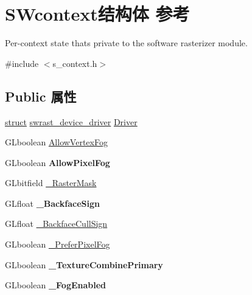 \hypertarget{struct_s_wcontext}{}\section{S\+Wcontext结构体 参考}
\label{struct_s_wcontext}


Per-\/context state that\textquotesingle{}s private to the software rasterizer module.  




{\ttfamily \#include $<$s\+\_\+context.\+h$>$}

\subsection*{Public 属性}
\begin{DoxyCompactItemize}
\item 
\hyperlink{interfacestruct}{struct} \hyperlink{structswrast__device__driver}{swrast\+\_\+device\+\_\+driver} \hyperlink{struct_s_wcontext_a0c0417617fb1e6d6a2976aba09a486c2}{Driver}
\item 
G\+Lboolean \hyperlink{struct_s_wcontext_af59816052a82b37da0e8e1152715959a}{Allow\+Vertex\+Fog}
\item 
\mbox{\label{struct_s_wcontext_a0f9330dfa9ce2ac36e81ee86ad077159}} 
G\+Lboolean {\bfseries Allow\+Pixel\+Fog}
\item 
G\+Lbitfield \hyperlink{struct_s_wcontext_ad2791c263e50ab089622ccef8cf998d1}{\+\_\+\+Raster\+Mask}
\item 
\mbox{\label{struct_s_wcontext_ac037e4e4a941f4c47b896397fd95a4c7}} 
G\+Lfloat {\bfseries \+\_\+\+Backface\+Sign}
\item 
G\+Lfloat \hyperlink{struct_s_wcontext_a51f029169973219098add5f8345c6874}{\+\_\+\+Backface\+Cull\+Sign}
\item 
G\+Lboolean \hyperlink{struct_s_wcontext_a756b218b6199d933c784a1ce6e7878d8}{\+\_\+\+Prefer\+Pixel\+Fog}
\item 
\mbox{\label{struct_s_wcontext_ab9fc6879eb7247c457792c56e00d4a71}} 
G\+Lboolean {\bfseries \+\_\+\+Texture\+Combine\+Primary}
\item 
\mbox{\label{struct_s_wcontext_a307854f83ef0e3e4783c5755cf2ae5d8}} 
G\+Lboolean {\bfseries \+\_\+\+Fog\+Enabled}
\item 

\end{DoxyCompactItemize}
